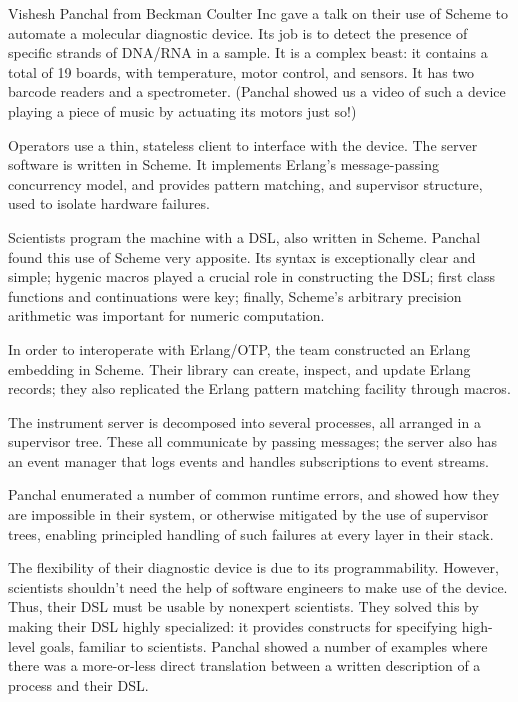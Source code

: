 \documentclass{jfp1}
\begin{document}

Vishesh Panchal from Beckman Coulter Inc gave a talk on their use of
Scheme to automate a molecular diagnostic device. Its job is to
detect the presence of specific strands of DNA/RNA in a sample. It is
a complex beast: it contains a total of 19 boards, with temperature,
motor control, and sensors. It has two barcode readers and a
spectrometer. (Panchal showed us a video of such a device playing a
piece of music by actuating its motors just so!)

Operators use a thin, stateless client to interface with the device.
The server software is written in Scheme. It implements Erlang's
message-passing concurrency model, and provides pattern matching, and
supervisor structure, used to isolate hardware failures.

Scientists program the machine with a DSL, also written in Scheme.
Panchal found this use of Scheme very apposite. Its syntax is
exceptionally clear and simple; hygenic macros played a crucial role
in constructing the DSL; first class functions and continuations were
key; finally, Scheme's arbitrary precision arithmetic was important
for numeric computation.

In order to interoperate with Erlang/OTP, the team constructed an
Erlang embedding in Scheme. Their library can create, inspect, and
update Erlang records; they also replicated the Erlang pattern
matching facility through macros.

The instrument server is decomposed into several processes, all
arranged in a supervisor tree. These all communicate by passing
messages; the server also has an event manager that logs events and
handles subscriptions to event streams.

Panchal enumerated a number of common runtime errors, and showed how
they are impossible in their system, or otherwise mitigated by the
use of supervisor trees, enabling principled handling of such
failures at every layer in their stack.

The flexibility of their diagnostic device is due to its
programmability. However, scientists shouldn't need the help of
software engineers to make use of the device. Thus, their DSL must be
usable by nonexpert scientists. They solved this by making their DSL
highly specialized: it provides constructs for specifying high-level
goals, familiar to scientists. Panchal showed a number of examples
where there was a more-or-less direct translation between a written
description of a process and their DSL.
\end{document}
